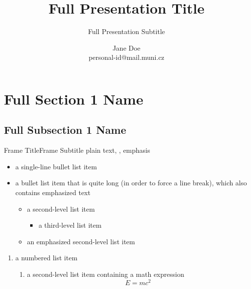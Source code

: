 \documentclass[
  aspectratio=169,
]{beamer}
\begin{document}
\title[Short Presentation Title]{Full Presentation Title}
\subtitle[Short Presentation Subtitle]{Full Presentation Subtitle}
\author[J.\,Doe]{Jane Doe \\ personal-id@mail.muni.cz}
\date{}
\subject{Presentation Subject}

\begin{frame}[plain]
\maketitle
\end{frame}

\section[Short Section 1 Name]{Full Section 1 Name}
\subsection[Short Subsection 1 Name]{Full Subsection 1 Name}

\begin{frame}{Frame Title}{Frame Subtitle}
plain text, , \alert{emphasis}
\begin{itemize}
  \item a single-line bullet list item
  \item a bullet list item that is quite long (in order to force a line break),
    which also contains \alert{emphasized text}
  \begin{itemize}
    \item a second-level list item
    \begin{itemize}
      \item a third-level list item
    \end{itemize}
    \item \alert{an emphasized second-level list item}
  \end{itemize}
\end{itemize}
\begin{enumerate}
  \item a numbered list item
  \begin{enumerate}
    \item a second-level list item containing a math expression
      \[ E = mc^2 \]
  \end{enumerate}
\end{enumerate}
\end{frame}
\end{document}

